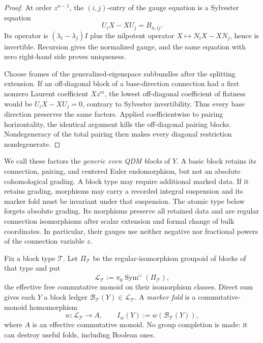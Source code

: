 \begin{proof}
At order \(z^{n-1}\), the \((i,j)\)-entry of the gauge equation is a Sylvester
equation
\[
 U_iX-XU_j=B_{n,ij}.
\]
Its operator is \((\lambda_i-\lambda_j)I\) plus the nilpotent operator
\(X\mapsto N_iX-XN_j\), hence is invertible.  Recursion gives the normalized
gauge, and the same equation with zero right-hand side proves uniqueness.

Choose frames of the generalized-eigenspace subbundles after the splitting
extension.  If an off-diagonal block of a base-direction connection had a
first nonzero Laurent coefficient \(Xz^m\), the lowest off-diagonal coefficient
of flatness would be \(U_iX-XU_j=0\), contrary to Sylvester invertibility.
Thus every base direction preserves the same factors.  Applied coefficientwise
to pairing horizontality, the identical argument kills the off-diagonal pairing
blocks.  Nondegeneracy of the total pairing then makes every diagonal
restriction nondegenerate.
\end{proof}

We call these factors the \emph{generic even QDM blocks} of \(Y\).  A basic
block retains its connection, pairing, and centered Euler endomorphism, but
not an absolute cohomological grading.  A block type may require additional
marked data.  If it retains grading, morphisms may carry a recorded integral
suspension and its marker fold must be invariant under that suspension.  The
atomic type below forgets absolute grading.  Its morphisms preserve all retained
data and are regular connection isomorphisms after scalar extension and formal
change of bulk coordinates.  In particular, their gauges use neither negative
nor fractional powers of the connection variable \(z\).

Fix a block type \(\mathcal T\).  Let \(\Pi_{\mathcal T}\) be the
regular-isomorphism groupoid of blocks of that type and put
\[
 \mathcal L_{\mathcal T}
 :=\pi_0\operatorname{Sym}^{\sqcup}(\Pi_{\mathcal T}),
\]
the effective free commutative monoid on their isomorphism classes.  Direct
sum gives each \(Y\) a block ledger
\(\mathcal B_{\mathcal T}(Y)\in\mathcal L_{\mathcal T}\).  A
\emph{marker fold} is a commutative-monoid homomorphism
\[
 w:\mathcal L_{\mathcal T}\longrightarrow A,
 \qquad I_w(Y):=w(\mathcal B_{\mathcal T}(Y)),
\]
where \(A\) is an effective commutative monoid.  No group completion is
made: it can destroy useful folds, including Boolean ones.

